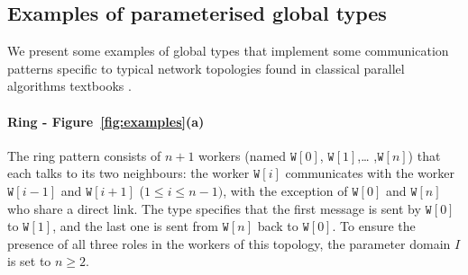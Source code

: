 \documentclass{LMCS}
\newcommand{\kf}[1]{\textup{\textsf{#1}}\xspace}
\newcommand{\RECSEQ}[4]{\ensuremath{\mathbf{R} \ #1\ \lambda #2.\lambda #3.#4}}
\newcommand{\End}{\kf{end}}
\newcommand{\Nat}{\kf{nat}}
\newcommand{\ENCan}[1]{\langle #1 \rangle}
\newcommand{\TO}[2]{#1\to #2}
\newcommand{\GS}[3]{\TO{#1}{#2}\colon \!\ENCan{#3}}
\newcommand{\APP}{\;}
\newcommand{\ii}{\ensuremath{i}}
\newcommand{\xx}{\ensuremath{\mathbf{x}}}
\newcommand{\yy}{\ensuremath{\mathbf{y}}}
\newcommand{\zz}{\ensuremath{\mathbf{z}}}
\newcommand{\W}{\ensuremath{\mathtt{W}}}
\begin{document}
\fi

\subsection{Examples of parameterised global types}
\label{sub:globalexample}
\noindent                                                                                                                                              
We present some examples of global types that implement some communication
patterns specific to typical network topologies found in classical parallel
algorithms textbooks \cite{FThomson}.

\paragraph{\bf Ring - Figure~\ref{fig:examples}(a)}
The ring pattern consists of $n+1$ workers (named $\W[0]$, $\W[1]$,\ldots
,$\W[n]$) that each talks to its
two neighbours: the worker $\W[\ii]$ communicates with the worker $\W[\ii-1]$
and $\W[\ii+1]$ ($1\leq\ii\leq n-1)$, with the exception of $\W[0]$ and $\W[n]$
who share a direct link. 
The type specifies that the first message is sent by $\W[0]$ to $\W[1]$, and the
last one is sent from $\W[n]$ back to $\W[0]$. To ensure the presence of all
three roles in the workers of this topology, the parameter domain $I$ is set to
$n \geq 2$.
\end{document}
